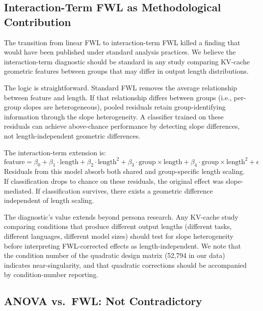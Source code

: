 \documentclass[11pt]{article}
\begin{document}
\subsection{Interaction-Term FWL as Methodological Contribution}
\label{sec:fwl-contribution}

The transition from linear FWL to interaction-term FWL killed a finding that would have been published under standard analysis practices. We believe the interaction-term diagnostic should be standard in any study comparing KV-cache geometric features between groups that may differ in output length distributions.

The logic is straightforward. Standard FWL removes the average relationship between feature and length. If that relationship differs between groups (i.e., per-group slopes are heterogeneous), pooled residuals retain group-identifying information through the slope heterogeneity. A classifier trained on these residuals can achieve above-chance performance by detecting slope differences, not length-independent geometric differences.

The interaction-term extension is:
%
\begin{equation}
\label{eq:interaction-fwl-repeat}
\text{feature} = \beta_0 + \beta_1 \cdot \text{length} + \beta_2 \cdot \text{length}^2 + \beta_3 \cdot \text{group} \times \text{length} + \beta_4 \cdot \text{group} \times \text{length}^2 + \epsilon
\end{equation}
%
Residuals from this model absorb both shared and group-specific length scaling. If classification drops to chance on these residuals, the original effect was slope-mediated. If classification survives, there exists a geometric difference independent of length scaling.

The diagnostic's value extends beyond persona research. Any KV-cache study comparing conditions that produce different output lengths (different tasks, different languages, different model sizes) should test for slope heterogeneity before interpreting FWL-corrected effects as length-independent. We note that the condition number of the quadratic design matrix (52,794 in our data) indicates near-singularity, and that quadratic corrections should be accompanied by condition-number reporting.

\subsection{ANOVA vs.\ FWL: Not Contradictory}
\label{sec:anova-vs-fwl}
\end{document}

